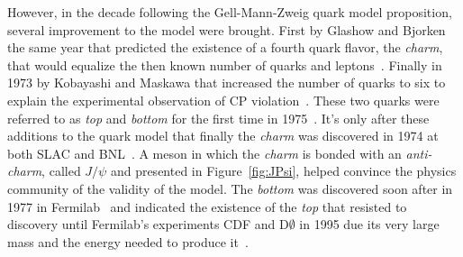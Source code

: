\endgroup
	
	However, in the decade following the Gell-Mann-Zweig quark model proposition, several improvement to the model were brought. First by Glashow and Bjorken the same year that predicted the existence of a fourth quark flavor, the \textit{charm}, that would equalize the then known number of quarks and leptons~\cite{BJORKEN1964,GLASHOW1970}. Finally in 1973 by Kobayashi and Maskawa that increased the number of quarks to six to explain the experimental observation of CP violation~\cite{CHRISTENSON1964,KOBAYASHI1973}. These two quarks were referred to as \textit{top} and \textit{bottom} for the first time in 1975~\cite{HARARI1975}. It's only after these additions to the quark model that finally the \textit{charm} was discovered in 1974 at both SLAC and \acf{BNL}~\cite{RICHTER1974,TING1974}. A meson in which the \textit{charm} is bonded with an \textit{anti-charm}, called $J/\psi$ and presented in Figure~\ref{fig:JPsi}, helped convince the physics community of the validity of the model. The \textit{bottom} was discovered soon after in 1977 in Fermilab~\cite{HERB1977} and indicated the existence of the \textit{top} that resisted to discovery until Fermilab's experiments CDF and D$\emptyset$ in 1995 due its very large mass and the energy needed to produce it~\cite{ABASHI1995,ABE1995}.
	
